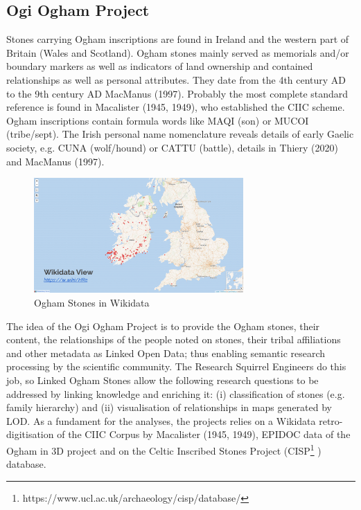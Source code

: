 \documentclass[twocolumn]{autart}
\begin{document}
\subsection{Ogi Ogham Project}

Stones carrying Ogham inscriptions are found in Ireland and the western part of Britain (Wales and Scotland). Ogham stones mainly served as memorials and/or boundary markers as well as indicators of land ownership and contained relationships as well as personal attributes. They date from the 4th century AD to the 9th century AD MacManus (1997)\cite{macmanus_guide_1997}. Probably the most complete standard reference is found in Macalister (1945, 1949)\cite{macalister_corpus_1945}\cite{macalister_corpus_1949}, who established the CIIC scheme. Ogham inscriptions contain formula words like MAQI (son) or MUCOI (tribe/sept). The Irish personal name nomenclature reveals details of early Gaelic society, e.g. CUNA (wolf/hound) or CATTU (battle), details in Thiery (2020)\cite{thiery_ogham_2020} and MacManus (1997)\cite{macmanus_guide_1997}.

\begin{figure}[!htb]
\begin{center}
\includegraphics[width=8cm]{ogham.png}
\caption{Ogham Stones in Wikidata}
\label{rq1}
\end{center}
\end{figure}

The idea of the Ogi Ogham Project is to provide the Ogham stones, their content, the relationships of the people noted on stones, their tribal affiliations and other metadata as Linked Open Data; thus enabling semantic research processing by the scientific community. The Research Squirrel Engineers do this job, so Linked Ogham Stones allow the following research questions to be addressed by linking knowledge and enriching it: (i) classification of stones (e.g. family hierarchy) and (ii) visualisation of relationships in maps generated by LOD. As a fundament for the analyses, the projects relies on a Wikidata retro-digitisation of the CIIC Corpus by Macalister (1945, 1949), EPIDOC data of the Ogham in 3D project and on the Celtic Inscribed Stones Project (CISP\footnote{https://www.ucl.ac.uk/archaeology/cisp/database/} ) database.
\end{document}
